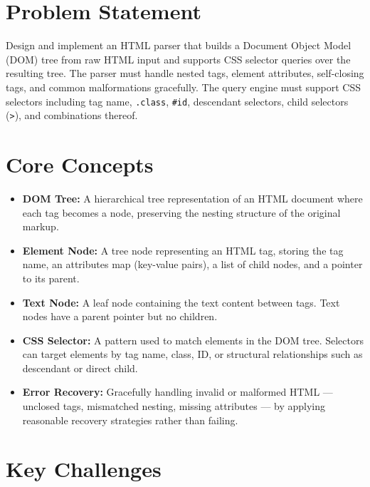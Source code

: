 \section{Problem Statement}

Design and implement an HTML parser that builds a Document Object Model (DOM) tree from raw HTML input and supports CSS selector queries over the resulting tree. The parser must handle nested tags, element attributes, self-closing tags, and common malformations gracefully. The query engine must support CSS selectors including tag name, \texttt{.class}, \texttt{\#id}, descendant selectors, child selectors (\texttt{>}), and combinations thereof.

\section{Core Concepts}

\begin{itemize}
  \item \textbf{DOM Tree:} A hierarchical tree representation of an HTML document where each tag becomes a node, preserving the nesting structure of the original markup.
  \item \textbf{Element Node:} A tree node representing an HTML tag, storing the tag name, an attributes map (key-value pairs), a list of child nodes, and a pointer to its parent.
  \item \textbf{Text Node:} A leaf node containing the text content between tags. Text nodes have a parent pointer but no children.
  \item \textbf{CSS Selector:} A pattern used to match elements in the DOM tree. Selectors can target elements by tag name, class, ID, or structural relationships such as descendant or direct child.
  \item \textbf{Error Recovery:} Gracefully handling invalid or malformed HTML --- unclosed tags, mismatched nesting, missing attributes --- by applying reasonable recovery strategies rather than failing.
\end{itemize}

\section{Key Challenges}

